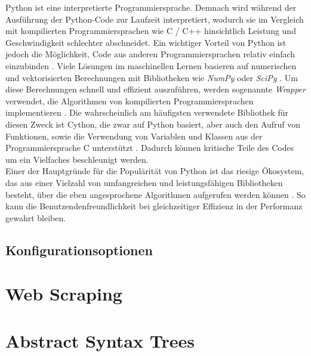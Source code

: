 \documentclass[german,bachelor]{swsLeipzig}
\begin{document}
Python ist eine interpretierte Programmiersprache.
Demnach wird während der Ausführung der Python-Code zur Laufzeit interpretiert, wodurch sie im Vergleich mit kompilierten
Programmiersprachen wie C / C++ hinsichtlich Leistung und Geschwindigkeit schlechter abschneidet.
Ein wichtiger Vorteil von Python ist jedoch die Möglichkeit, Code aus anderen Programmiersprachen relativ einfach einzubinden \cite[S.977]{8757088}.
Viele Lösungen im maschinellen Lernen basieren auf numerischen und vektorisierten Berechnungen mit Bibliotheken
wie \textit{NumPy} oder \textit{SciPy} \cite[S.977]{8757088}.
Um diese Berechnungen schnell und effizient auszuführen, werden sogenannte \textit{Wrapper} verwendet,
die Algorithmen von kompilierten Programmiersprachen implementieren \cite[S.977]{8757088}.
Die wahrscheinlich am häufigsten verwendete Bibliothek für diesen Zweck ist Cython, die zwar auf Python basiert,
aber auch den Aufruf von Funktionen, sowie die Verwendung von Variablen und Klassen aus der Programmiersprache C unterstützt \cite[S.977]{8757088}.
Dadurch können kritische Teile des Codes um ein Vielfaches beschleunigt werden. \\

Einer der Hauptgründe für die Populärität von Python ist das riesige Ökosystem, das aus einer Vielzahl
von umfangreichen und leistungsfähigen Bibliotheken besteht, über die eben angesprochene Algorithmen aufgerufen werden können \cite[S. 2]{2020}.
So kann die Benutzendenfreundlichkeit bei gleichzeitiger Effizienz in der Performanz gewahrt bleiben.



\subsection{Konfigurationsoptionen}


\section{Web Scraping}


\section{Abstract Syntax Trees}
\end{document}
